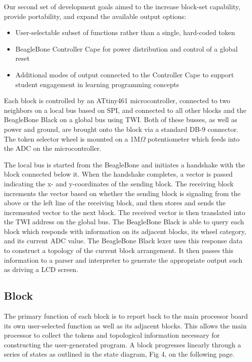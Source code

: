 \documentclass[12pt,a4paper]{article}
\begin{document}
Our second set of development goals aimed to the increase block-set capability, provide portability, and expand the available output options:
\begin{itemize}
	\item User-selectable subset of functions rather than a single, hard-coded token
	\item BeagleBone Controller Cape for power distribution and control of a global reset
	\item Additional modes of output connected to the Controller Cape to support student engagement in learning programming concepts
	
\end{itemize}
Each block is controlled by an ATtiny461 microcontroller, connected to two neighbors on a local bus based on SPI, and connected to all other blocks and the BeagleBone Black on a global bus using TWI. Both of these busses, as well as power and ground, are brought onto the block via a standard DB-9 connector. The token selector wheel is mounted on a 1M$\Omega$ potentiometer which feeds into the ADC on the microcontroller.


The local bus is started from the BeagleBone and initiates a handshake with the block connected below it. When the handshake completes, a vector is passed indicating the x- and y-coordinates of the sending block. The receiving block increments the vector based on whether the sending block is signaling from the above or the left line of the receiving block, and then stores and sends the incremented vector to the next block. The received vector is then translated into the TWI address on the global bus. The BeagleBone Black is able to query each block which responds with information on its adjacent blocks, its wheel category, and its current ADC value. The BeagleBone Black lexer uses this response data to construct a topology of the current block arrangement. It then passes this information to a parser and interpreter to generate the appropriate output such as driving a LCD screen.
\subsection{Block}
    The primary function of each block is to report back to the main processor board its own user-selected function as well as its adjacent blocks. This allows the main processor to collect the tokens and topological information necessary for constructing the user-generated program. A block progresses linearly through a series of states as outlined in the state diagram, Fig 4, on the following page.
\end{document}
